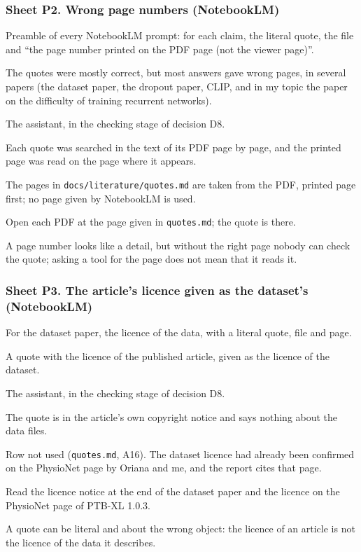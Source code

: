 \subsubsection*{Sheet P2. Wrong page numbers (NotebookLM)}
\begin{description}[style=nextline,leftmargin=1.2em]
  \item[Prompt] Preamble of every NotebookLM prompt: for each claim, the literal quote, the file and ``the
        page number printed on the PDF page (not the viewer page)''.
  \item[Faulty response] The quotes were mostly correct, but most answers gave wrong pages, in several
        papers (the dataset paper, the dropout paper, CLIP, and in my topic the paper on the difficulty of
        training recurrent networks).
  \item[Detected by] The assistant, in the checking stage of decision D8.
  \item[Proof] Each quote was searched in the text of its PDF page by page, and the printed page was read
        on the page where it appears.
  \item[Correction] The pages in \texttt{docs/literature/quotes.md} are taken from the PDF, printed page
        first; no page given by NotebookLM is used.
  \item[Reproduction] Open each PDF at the page given in \texttt{quotes.md}; the quote is there.
  \item[Reflection] A page number looks like a detail, but without the right page nobody can check the
        quote; asking a tool for the page does not mean that it reads it.
\end{description}

\subsubsection*{Sheet P3. The article's licence given as the dataset's (NotebookLM)}
\begin{description}[style=nextline,leftmargin=1.2em]
  \item[Prompt] For the dataset paper, the licence of the data, with a literal quote, file and page.
  \item[Faulty response] A quote with the licence of the published article, given as the licence of the
        dataset.
  \item[Detected by] The assistant, in the checking stage of decision D8.
  \item[Proof] The quote is in the article's own copyright notice and says nothing about the data files.
  \item[Correction] Row not used (\texttt{quotes.md}, A16). The dataset licence had already been confirmed
        on the PhysioNet page by Oriana and me, and the report cites that page.
  \item[Reproduction] Read the licence notice at the end of the dataset paper and the licence on the
        PhysioNet page of PTB-XL 1.0.3.
  \item[Reflection] A quote can be literal and about the wrong object: the licence of an article is not the
        licence of the data it describes.
\end{description}

